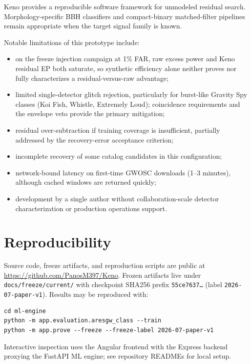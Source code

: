 \documentclass[11pt,a4paper]{article}
\begin{document}
Keno provides a reproducible software framework for unmodeled residual search.
Morphology-specific BBH classifiers and compact-binary matched-filter
pipelines~\citep{nousi2023,koloniari2025} remain appropriate when the target
signal family is known.

Notable limitations of this prototype include:
\begin{itemize}
  \item on the freeze injection campaign at 1\% FAR, raw excess power and Keno
        residual EP both saturate, so synthetic efficiency alone neither proves
        nor fully characterizes a residual-versus-raw advantage;
  \item limited single-detector glitch rejection, particularly for burst-like
        Gravity Spy classes (Koi Fish, Whistle, Extremely Loud); coincidence
        requirements and the envelope veto provide the primary mitigation;
  \item residual over-subtraction if training coverage is insufficient,
        partially addressed by the recovery-error acceptance criterion;
  \item incomplete recovery of some catalog candidates in this configuration;
  \item network-bound latency on first-time GWOSC downloads (1--3 minutes),
        although cached windows are returned quickly;
  \item development by a single author without collaboration-scale detector
        characterization or production operations support.
\end{itemize}

\section{Reproducibility}

Source code, freeze artifacts, and reproduction scripts are public at
\url{https://github.com/PanosM397/Keno}.
Frozen artifacts live under \texttt{docs/freeze/current/} with checkpoint
SHA256 prefix \texttt{55ce7637\ldots} (label \texttt{2026-07-paper-v1}).
Results may be reproduced with:
\begin{verbatim}
cd ml-engine
python -m app.evaluation.aresgw_class --train
python -m app.prove --freeze --freeze-label 2026-07-paper-v1
\end{verbatim}
Interactive inspection uses the Angular frontend with the Express backend
proxying the FastAPI ML engine; see repository READMEs for local setup.
\end{document}

